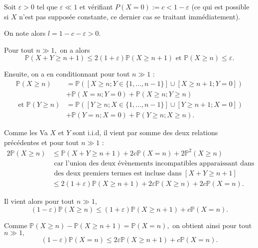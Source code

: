 

Soit $\varepsilon>0$ tel que $\varepsilon\ll1$ et vérifiant $\displaystyle P(X=0):=c<1-\varepsilon$ (ce qui est possible si $X$ n'est pas supposée constante, ce dernier cas se traitant immédiatement).

On note alors $\displaystyle l=1-c-\varepsilon>0.$

Pour tout $n\gg1,$ on a alors $$\mathbb{P}(X+Y\geq n+1)\leq 2(1+\varepsilon)\mathbb{P}(X\geq n+1) \mbox{ et } \mathbb{P}(X\geq n)\leq \varepsilon.$$ 

Ensuite, on a en conditionnant pour tout $n\gg1$ :
\begin{align*}
\mathbb{P}(X\geq n) & =\mathbb{P}([X\geq n;Y\in\{1,\ldots,n-1\}]\cup[X\geq n+1;Y=0])\\
& +\mathbb{P}(X=n;Y=0)+\mathbb{P}(X\geq n;Y\geq n)\\
\mbox{ et } \mathbb{P}(Y\geq n) & =\mathbb{P}([Y\geq n;X\in\{1,\ldots,n-1\}]\cup[Y\geq n+1;X=0])\\
& +\mathbb{P}(Y=n;X=0)+\mathbb{P}(Y\geq n;X\geq n).
\end{align*}

Comme les Va $X$ et $Y$ sont i.i.d, il vient par somme des deux relations précédentes et pour tout $n\gg1$ :
\begin{align*}
2\mathbb{P}(X\geq n) & \leq \mathbb{P}(X+Y\geq n+1)+2c\mathbb{P}(X=n)+2\mathbb{P}^{2}(X\geq n)\\
& \mbox{ car l'union des deux évènements incompatibles apparaissant dans chacun }\\
& \mbox{ des deux premiers termes est incluse dans } [X+Y\geq n+1]\\ 
&\leq 2(1+\varepsilon)\mathbb{P}(X\geq n+1) +2\varepsilon \mathbb{P}(X\geq n)+2c\mathbb{P}(X=n).
\end{align*}

Il vient alors pour tout $n\gg 1,$ $$ (1-\varepsilon)\mathbb{P}(X\geq n)\leq (1+\varepsilon)\mathbb{P}(X\geq n+1)+c\mathbb{P}(X=n).$$

Comme $\displaystyle \mathbb{P}(X\geq n)-\mathbb{P}(X\geq n+1)=\mathbb{P}(X=n),$ on obtient ainsi pour tout $n\gg1,$ $$ (1-\varepsilon)\mathbb{P}(X=n)\leq 2\varepsilon\mathbb{P}(X\geq n+1)+c\mathbb{P}(X=n).$$

